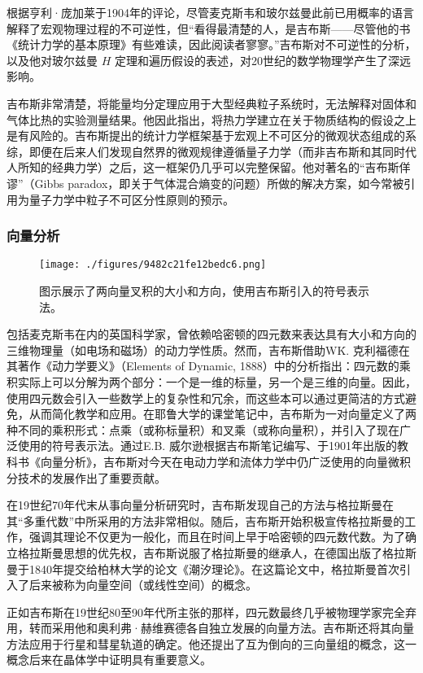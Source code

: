 根据亨利·庞加莱于1904年的评论，尽管麦克斯韦和玻尔兹曼此前已用概率的语言解释了宏观物理过程的不可逆性，但“看得最清楚的人，是吉布斯——尽管他的书《统计力学的基本原理》有些难读，因此阅读者寥寥。”吉布斯对不可逆性的分析，以及他对玻尔兹曼 $H$ 定理和遍历假设的表述，对20世纪的数学物理学产生了深远影响。

吉布斯非常清楚，将能量均分定理应用于大型经典粒子系统时，无法解释对固体和气体比热的实验测量结果。他因此指出，将热力学建立在关于物质结构的假设之上是有风险的。吉布斯提出的统计力学框架基于宏观上不可区分的微观状态组成的系综，即便在后来人们发现自然界的微观规律遵循量子力学（而非吉布斯和其同时代人所知的经典力学）之后，这一框架仍几乎可以完整保留。他对著名的“吉布斯佯谬”（Gibbs paradox，即关于气体混合熵变的问题）所做的解决方案，如今常被引用为量子力学中粒子不可区分性原则的预示。
\subsubsection{向量分析}
\begin{figure}[ht]
\centering
\texttt{[image: ./figures/9482c21fe12bedc6.png]}
\caption{图示展示了两向量叉积的大小和方向，使用吉布斯引入的符号表示法。} \label{fig_QSY_8}
\end{figure}
包括麦克斯韦在内的英国科学家，曾依赖哈密顿的四元数来表达具有大小和方向的三维物理量（如电场和磁场）的动力学性质。然而，吉布斯借助W\.K. 克利福德在其著作《动力学要义》（Elements of Dynamic, 1888）中的分析指出：四元数的乘积实际上可以分解为两个部分：一个是一维的标量，另一个是三维的向量。因此，使用四元数会引入一些数学上的复杂性和冗余，而这些本可以通过更简洁的方式避免，从而简化教学和应用。在耶鲁大学的课堂笔记中，吉布斯为一对向量定义了两种不同的乘积形式：点乘（或称标量积）和叉乘（或称向量积），并引入了现在广泛使用的符号表示法。通过E.B. 威尔逊根据吉布斯笔记编写、于1901年出版的教科书《向量分析》，吉布斯对今天在电动力学和流体力学中仍广泛使用的向量微积分技术的发展作出了重要贡献。

在19世纪70年代末从事向量分析研究时，吉布斯发现自己的方法与格拉斯曼在其“多重代数”中所采用的方法非常相似。随后，吉布斯开始积极宣传格拉斯曼的工作，强调其理论不仅更为一般化，而且在时间上早于哈密顿的四元数代数。为了确立格拉斯曼思想的优先权，吉布斯说服了格拉斯曼的继承人，在德国出版了格拉斯曼于1840年提交给柏林大学的论文《潮汐理论》。在这篇论文中，格拉斯曼首次引入了后来被称为向量空间（或线性空间）的概念。

正如吉布斯在19世纪80至90年代所主张的那样，四元数最终几乎被物理学家完全弃用，转而采用他和奥利弗·赫维赛德各自独立发展的向量方法。吉布斯还将其向量方法应用于行星和彗星轨道的确定。他还提出了互为倒向的三向量组的概念，这一概念后来在晶体学中证明具有重要意义。
